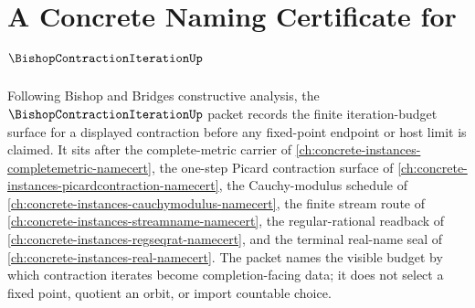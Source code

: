 \chapter{A Concrete Naming Certificate for $\BishopContractionIterationUp$}
\label{ch:concrete-instances-bishop-contraction-iteration-namecert}

Following Bishop and Bridges constructive analysis, the $\BishopContractionIterationUp$ packet records the finite iteration-budget surface for a displayed contraction before any fixed-point endpoint or host limit is claimed. It sits after the complete-metric carrier of \autoref{ch:concrete-instances-completemetric-namecert}, the one-step Picard contraction surface of \autoref{ch:concrete-instances-picardcontraction-namecert}, the Cauchy-modulus schedule of \autoref{ch:concrete-instances-cauchymodulus-namecert}, the finite stream route of \autoref{ch:concrete-instances-streamname-namecert}, the regular-rational readback of \autoref{ch:concrete-instances-regseqrat-namecert}, and the terminal real-name seal of \autoref{ch:concrete-instances-real-namecert}. The packet names the visible budget by which contraction iterates become completion-facing data; it does not select a fixed point, quotient an orbit, or import countable choice.

